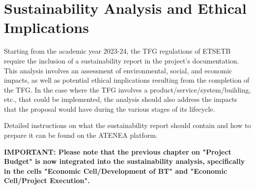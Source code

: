 \else
\chapter{Sustainability Analysis and Ethical Implications}
Starting from the academic year 2023-24, the TFG regulations of ETSETB require the inclusion of a sustainability report in the project's documentation. This analysis involves an assessment of environmental, social, and economic impacts, as well as potential ethical implications resulting from the completion of the TFG. In the case where the TFG involves a product/service/system/building, etc., that could be implemented, the analysis should also address the impacts that the proposal would have during the various stages of its lifecycle.

Detailed instructions on what the sustainability report should contain and how to prepare it can be found on the ATENEA platform.

{\bigskip\bfseries {\large IMPORTANT:} Please note that the previous chapter on "Project Budget" is now integrated into the sustainability analysis, specifically in the cells "Economic Cell/Development of BT" and "Economic Cell/Project Execution".}

\fi